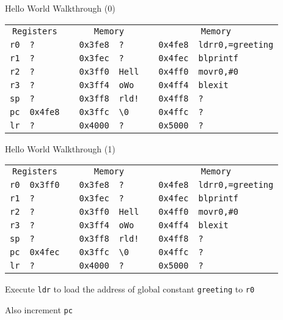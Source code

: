 \begin{frame}{Hello World Walkthrough (0)}
    \begin{alltt}
        \begin{tabular}{ r | l p{2mm} r | l p{2mm} r | l }
            \multicolumn{2}{c}{Registers} && \multicolumn{2}{c}{Memory} && \multicolumn{2}{c}{Memory} \\
            r0 & ? && 0x3fe8 & ? && 0x4fe8 & ldr r0, =greeting \\
            r1 & ? && 0x3fec & ? && 0x4fec & bl printf \\
            r2 & ? && 0x3ff0 & Hell && 0x4ff0 & mov r0, \#0 \\
            r3 & ? && 0x3ff4 & o Wo && 0x4ff4 & bl exit \\
            sp & ? && 0x3ff8 & rld! && 0x4ff8 & ? \\
            pc & 0x4fe8 && 0x3ffc & {\textbackslash}0 && 0x4ffc & ? \\
            lr & ? && 0x4000 & ? && 0x5000 & ? \\
            \end{tabular}
        \end{alltt}
\end{frame}



\begin{frame}{Hello World Walkthrough (1)}
    \begin{alltt}
        \begin{tabular}{ r | l p{2mm} r | l p{2mm} r | l }
            \multicolumn{2}{c}{Registers} && \multicolumn{2}{c}{Memory} && \multicolumn{2}{c}{Memory} \\
            r0 & 0x3ff0 && 0x3fe8 & ? && 0x4fe8 & ldr r0, =greeting \\
            r1 & ? && 0x3fec & ? && 0x4fec & bl printf \\
            r2 & ? && 0x3ff0 & Hell && 0x4ff0 & mov r0, \#0 \\
            r3 & ? && 0x3ff4 & o Wo && 0x4ff4 & bl exit \\
            sp & ? && 0x3ff8 & rld! && 0x4ff8 & ? \\
            pc & 0x4fec && 0x3ffc & {\textbackslash}0 && 0x4ffc & ? \\
            lr & ? && 0x4000 & ? && 0x5000 & ? \\
            \end{tabular}
        \end{alltt}

        Execute \texttt{ldr} to load the address of global constant \texttt{greeting} to \texttt{r0}
        
        Also increment \texttt{pc}

\end{frame}

